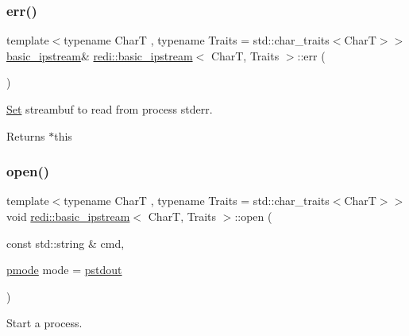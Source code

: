 \subsubsection{\texorpdfstring{err()}{err()}}
{\footnotesize\ttfamily template$<$typename CharT , typename Traits  = std\+::char\+\_\+traits$<$\+Char\+T$>$$>$ \\
\mbox{\hyperlink{classredi_1_1basic__ipstream}{basic\+\_\+ipstream}}\& \mbox{\hyperlink{classredi_1_1basic__ipstream}{redi\+::basic\+\_\+ipstream}}$<$ CharT, Traits $>$\+::err (\begin{DoxyParamCaption}{ }\end{DoxyParamCaption})\hspace{0.3cm}{\ttfamily [inline]}}



\mbox{\hyperlink{classSet}{Set}} streambuf to read from process\textquotesingle{} {\ttfamily stderr}. 

\begin{DoxyReturn}{Returns}
{\ttfamily $\ast$this} 
\end{DoxyReturn}
\mbox{\label{classredi_1_1basic__ipstream_aadcf86d0692356fef3bb4f1cb59e8a0d}} 
\subsubsection{\texorpdfstring{open()}{open()}\hspace{0.1cm}{\footnotesize\ttfamily [1/2]}}
{\footnotesize\ttfamily template$<$typename CharT , typename Traits  = std\+::char\+\_\+traits$<$\+Char\+T$>$$>$ \\
void \mbox{\hyperlink{classredi_1_1basic__ipstream}{redi\+::basic\+\_\+ipstream}}$<$ CharT, Traits $>$\+::open (\begin{DoxyParamCaption}\item[{const std\+::string \&}]{cmd,  }\item[{\mbox{\hyperlink{structredi_1_1pstreams_a1eae4aad88812af03a0fbb3ec13c50b7}{pmode}}}]{mode = {\ttfamily \mbox{\hyperlink{structredi_1_1pstreams_ad3c6d53a98de4566478b1c40c101a42b}{pstdout}}} }\end{DoxyParamCaption})\hspace{0.3cm}{\ttfamily [inline]}}



Start a process. 

